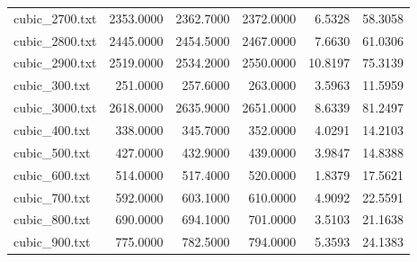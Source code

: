 \begin{table}[h!]
\begin{tabular}{lrrrrr}
cubic_2700.txt & 2353.0000 & 2362.7000 & 2372.0000 & 6.5328 & 58.3058 \\
cubic_2800.txt & 2445.0000 & 2454.5000 & 2467.0000 & 7.6630 & 61.0306 \\
cubic_2900.txt & 2519.0000 & 2534.2000 & 2550.0000 & 10.8197 & 75.3139 \\
cubic_300.txt & 251.0000 & 257.6000 & 263.0000 & 3.5963 & 11.5959 \\
cubic_3000.txt & 2618.0000 & 2635.9000 & 2651.0000 & 8.6339 & 81.2497 \\
cubic_400.txt & 338.0000 & 345.7000 & 352.0000 & 4.0291 & 14.2103 \\
cubic_500.txt & 427.0000 & 432.9000 & 439.0000 & 3.9847 & 14.8388 \\
cubic_600.txt & 514.0000 & 517.4000 & 520.0000 & 1.8379 & 17.5621 \\
cubic_700.txt & 592.0000 & 603.1000 & 610.0000 & 4.9092 & 22.5591 \\
cubic_800.txt & 690.0000 & 694.1000 & 701.0000 & 3.5103 & 21.1638 \\
cubic_900.txt & 775.0000 & 782.5000 & 794.0000 & 5.3593 & 24.1383 \\
\hline
\end{tabular}
\end{table}
